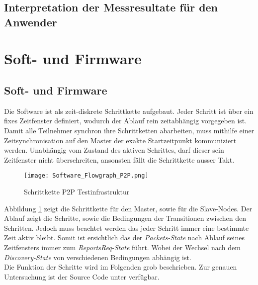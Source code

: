 \subsection{Interpretation der Messresultate für den Anwender}\label{sec:InterpretationderMessresultatefürdenAnwender}


\section{Soft- und Firmware}\label{sec:P2PSoft-undFirmware}

\subsection{Soft- und Firmware}\label{sec:SoftundFirmware}

Die Software ist als zeit-diskrete Schrittkette aufgebaut. Jeder Schritt ist über ein fixes Zeitfenster definiert, wodurch der Ablauf rein zeitabhängig vorgegeben ist. Damit alle Teilnehmer synchron ihre Schrittketten abarbeiten, muss mithilfe einer Zeitsynchronisation auf den Master der exakte Startzeitpunkt kommuniziert werden. Unabhängig vom Zustand des aktiven Schrittes, darf dieser sein Zeitfenster nicht überschreiten, ansonsten fällt die Schrittkette ausser Takt. 

\begin{figure} [H]
	\centering
	\texttt{[image: Software\_Flowgraph\_P2P.png]}
	\caption{Schrittkette P2P Testinfrastruktur}
	\label{fig:FlowgraphP2P}
\end{figure}

Abbildung \ref{fig:FlowgraphP2P} zeigt die Schrittkette für den Master, sowie für die Slave-Nodes. Der Ablauf zeigt die Schritte, sowie die Bedingungen der Transitionen zwischen den Schritten. Jedoch muss beachtet werden das jeder Schritt immer eine bestimmte Zeit aktiv bleibt. Somit ist ersichtlich das der \textit{Packets-State} nach Ablauf seines Zeitfensters immer zum \textit{ReportsReq-State} führt. Wobei der Wechsel nach dem \textit{Discovery-State} von verschiedenen Bedingungen abhängig ist. \\

Die Funktion der Schritte wird im Folgenden grob beschrieben. Zur genauen Untersuchung ist der Source Code unter \cite{github_p6_software_p2p_2020} verfügbar.  \\


